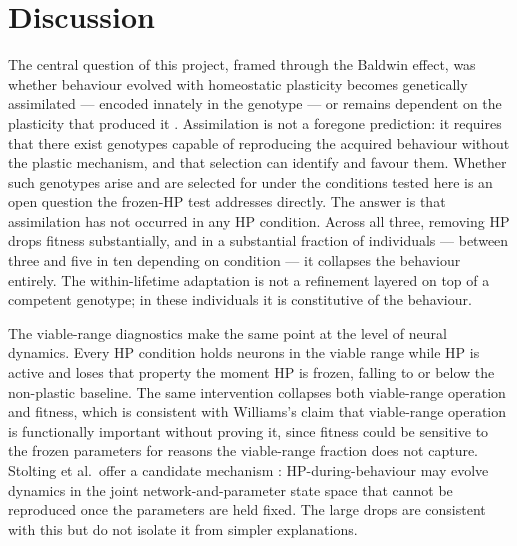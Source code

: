 %
%
%
%

\section{Discussion}
\label{sec:discussion}

The central question of this project, framed through the Baldwin effect, was
whether behaviour evolved with homeostatic plasticity becomes genetically
assimilated --- encoded innately in the genotype --- or remains dependent on the
plasticity that produced it \parencite{baldwin1896, hintonnowlan1987}. Assimilation
is not a foregone prediction: it requires that there exist genotypes capable of
reproducing the acquired behaviour without the plastic mechanism, and that selection
can identify and favour them. Whether such genotypes arise and are selected for
under the conditions tested here is an open question the frozen-HP test addresses
directly. The answer is that assimilation has not occurred in any HP condition.
Across all three, removing HP drops fitness substantially, and in a substantial
fraction of individuals --- between three and five in ten depending on condition
--- it collapses the behaviour entirely. The within-lifetime adaptation is not a
refinement layered on top of a competent genotype; in these individuals it is
constitutive of the behaviour.

The viable-range diagnostics make the same point at the level of neural
dynamics. Every HP condition holds neurons in the viable range while HP is
active and loses that property the moment HP is frozen, falling to or below the
non-plastic baseline. The same intervention collapses both viable-range
operation and fitness, which is consistent with Williams's claim that
viable-range operation is functionally important
\parencite{williams2006} without proving it, since fitness could be sensitive
to the frozen parameters for reasons the viable-range fraction does not capture.
Stolting et al.\ offer a candidate mechanism \parencite{stolting2023}:
HP-during-behaviour may evolve dynamics in the joint network-and-parameter state
space that cannot be reproduced once the parameters are held fixed. The large
drops are consistent with this but do not isolate it from simpler explanations.

